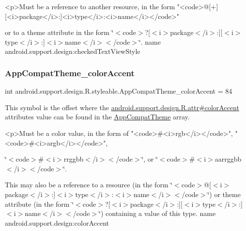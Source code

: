 \begin{DoxyVerb}      <p>Must be a reference to another resource, in the form "<code>@[+][<i>package</i>:]<i>type</i>:<i>name</i></code>"
\end{DoxyVerb}
 or to a theme attribute in the form \char`\"{}$<$code$>$?\mbox{[}$<$i$>$package$<$/i$>$\+:\mbox{]}\mbox{[}$<$i$>$type$<$/i$>$\+:\mbox{]}$<$i$>$name$<$/i$>$$<$/code$>$\char`\"{}.  name android.\+support.\+design\+:checked\+Text\+View\+Style \mbox{\label{classandroid_1_1support_1_1design_1_1R_1_1styleable_ade0801de138ef167ffaf75a110ce48b0}} 
\subsubsection{\texorpdfstring{App\+Compat\+Theme\+\_\+color\+Accent}{AppCompatTheme\_colorAccent}}
{\footnotesize\ttfamily int android.\+support.\+design.\+R.\+styleable.\+App\+Compat\+Theme\+\_\+color\+Accent = 84\hspace{0.3cm}{\ttfamily [static]}}

This symbol is the offset where the \hyperlink{classandroid_1_1support_1_1design_1_1R_1_1attr_a34c84599954f6b50d417431a1fc96ff5}{android.\+support.\+design.\+R.\+attr\#color\+Accent} attribute\textquotesingle{}s value can be found in the \hyperlink{classandroid_1_1support_1_1design_1_1R_1_1styleable_afb351dc8de20cbd4c89abe360373010c}{App\+Compat\+Theme} array.

\begin{DoxyVerb}      <p>Must be a color value, in the form of "<code>#<i>rgb</i></code>", "<code>#<i>argb</i></code>",
\end{DoxyVerb}
 \char`\"{}$<$code$>$\#$<$i$>$rrggbb$<$/i$>$$<$/code$>$\char`\"{}, or \char`\"{}$<$code$>$\#$<$i$>$aarrggbb$<$/i$>$$<$/code$>$\char`\"{}. 

This may also be a reference to a resource (in the form \char`\"{}$<$code$>$@\mbox{[}$<$i$>$package$<$/i$>$\+:\mbox{]}$<$i$>$type$<$/i$>$\+:$<$i$>$name$<$/i$>$$<$/code$>$\char`\"{}) or theme attribute (in the form \char`\"{}$<$code$>$?\mbox{[}$<$i$>$package$<$/i$>$\+:\mbox{]}\mbox{[}$<$i$>$type$<$/i$>$\+:\mbox{]}$<$i$>$name$<$/i$>$$<$/code$>$\char`\"{}) containing a value of this type.  name android.\+support.\+design\+:color\+Accent \mbox{\label{classandroid_1_1support_1_1design_1_1R_1_1styleable_ab55fa86e1ca1799c130f3c2f5b8ef8a1}} 
